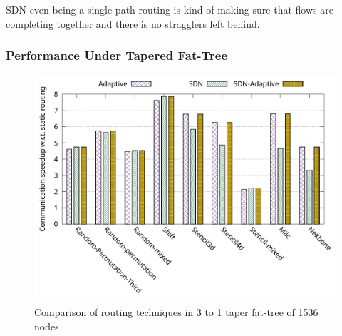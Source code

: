 SDN even being a single path routing is kind of making sure that flows are completing together and there is no stragglers left behind. 


\subsubsection{Performance Under Tapered Fat-Tree}



\begin{figure}[h]
  \centering
  \includegraphics[width=\columnwidth]{./figs_4/routing_taper.pdf}
  \caption{Comparison of routing techniques in 3 to 1 taper fat-tree of 1536 nodes}
  \label{fig:routing_taper}
\end{figure}


